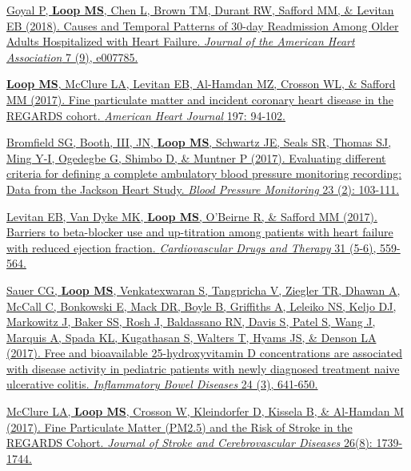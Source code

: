 \documentclass[10pt,letterpaper]{article}
\begin{document}
\begin{etaremune}
\item \href{https://www.ahajournals.org/doi/full/10.1161/JAHA.117.007785}{Goyal P, \textbf{Loop MS}, Chen L, Brown TM, Durant RW, Safford MM, \& Levitan EB (2018).  Causes and Temporal Patterns of 30-day Readmission Among Older Adults Hospitalized with Heart Failure. \emph{Journal of the American Heart Association} 7 (9), e007785.}

\item \href{https://www.sciencedirect.com/science/article/pii/S0002870317303630}{\textbf{Loop MS}, McClure LA, Levitan EB, Al-Hamdan MZ, Crosson WL, \& Safford MM (2017). Fine particulate matter and incident coronary heart disease in the REGARDS cohort. \emph{American Heart Journal} 197: 94-102.}

\item \href{https://www.ingentaconnect.com/content/wk/mbp/2018/00000023/00000002/art00007}{Bromfield SG, Booth, III, JN, \textbf{Loop MS}, Schwartz JE, Seals SR, Thomas SJ, Ming Y-I, Ogedegbe G, Shimbo D, \& Muntner P (2017). Evaluating different criteria for defining a complete ambulatory blood pressure monitoring recording: Data from the Jackson Heart Study. \emph{Blood Pressure Monitoring} 23 (2): 103-111.}

\item \href{https://link.springer.com/article/10.1007/s10557-017-6764-8}{Levitan EB, Van Dyke MK, \textbf{Loop MS}, O'Beirne R, \& Safford MM (2017). Barriers to beta-blocker use and up-titration among patients with heart failure with reduced ejection fraction. \emph{Cardiovascular Drugs and Therapy} 31 (5-6), 559-564.}

\item \href{https://academic.oup.com/ibdjournal/article/24/3/641/4863703}{Sauer CG, \textbf{Loop MS}, Venkatexwaran S, Tangpricha V, Ziegler TR, Dhawan A, McCall C, Bonkowski E, Mack DR, Boyle B, Griffiths A, Leleiko NS, Keljo DJ, Markowitz J, Baker SS, Rosh J, Baldassano RN, Davis S, Patel S, Wang J, Marquis A, Spada KL, Kugathasan S, Walters T, Hyams JS, \& Denson LA (2017). Free and bioavailable 25-hydroxyvitamin D concentrations are associated with disease activity in pediatric patients with newly diagnosed treatment naive ulcerative colitis. \emph{Inflammatory Bowel Diseases} 24 (3), 641-650.}

\item \href{https://www.sciencedirect.com/science/article/pii/S1052305717301568}{McClure LA, \textbf{Loop MS}, Crosson W, Kleindorfer D, Kissela B, \& Al-Hamdan M (2017). Fine Particulate Matter (PM2.5) and the Risk of Stroke in the REGARDS Cohort. \emph{Journal of Stroke and Cerebrovascular Diseases} 26(8): 1739-1744.}


\end{etaremune}
\end{document}
